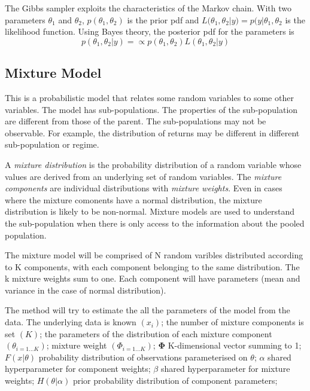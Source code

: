 \documentclass[12pt, a4paper, oneside]{article}\usepackage[]{graphicx}\usepackage[]{color}
\begin{document}
The Gibbs sampler exploits the characteristics of the Markov chain.  With two parameters $\theta_1$ and $\theta_2$, $p(\theta_1, \theta_2)$ is the prior pdf and $L(\theta_1, \theta_2 | y) = p(y | \theta_1, \theta_2$ is the likelihood function.  Using Bayes theory, the posterior pdf for the parameters is 
\begin{equation}
p(\theta_1, \theta_2| y) = \propto p(\theta_1, \theta_2)L(\theta_1, \theta_2| y)
\end{equation}


\subsection{Mixture Model}
This is a probabilistic model that relates some random variables to some other variables.  The model has sub-populations. The properties of the sub-population are different from those of the parent. The sub-populations may not be observable.  For example, the distribution of returns may be different in different sub-population or regime. 

A \emph{mixture distribution} is the probability distribution of a random variable  whose values are derived from an underlying set of random variables. The \emph{mixture components} are individual distributions with \emph{mixture weights}.  Even in cases where the mixture comonents have a normal distribution, the mixture distribution is likely to be non-normal. Mixture models are used to understand the sub-population when there is only access to the information about the pooled population. 

The mixture model will be comprised of N random varibles distributed according to K components, with each component belonging to the same distribution. The k mixture weights sum to one. Each component will have parameters (mean and variance in the case of normal distribution).  

The method will try to estimate the all the parameters of the model from the data.  The underlying data is known $(x_i)$; the number of mixture components is set $(K)$; the parameters of the distribution of each mixture component $(\theta_{i=1\dots K})$; mixture weight $(\Phi_{i = 1\dots K})$; $\mathbf{\Phi}$ K-dimensional vector summing to 1; $F(x|\theta)$ probability distribution of observations parameterised on $\theta$; $\alpha$ shared hyperparameter for component weights; $\beta$ shared hyperparameter for mixture weights; $H(\theta|\alpha)$ prior probability distribution of component parameters; 
\end{document}
